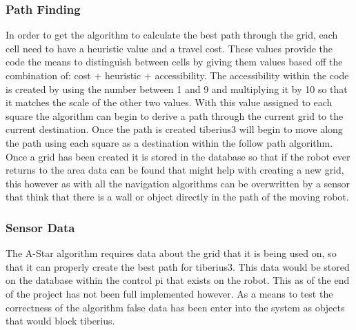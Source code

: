 \subsubsection{Path Finding}
In order to get the algorithm to calculate the best path through the grid, each cell need to have a heuristic value and a travel cost. These values provide the code the means to distinguish between cells by giving them values based off the combination of: cost + heuristic + accessibility. The accessibility within the code is created by using the number between 1 and 9 and multiplying it by 10 so that it matches the scale of the other two values. With this value assigned to each square the algorithm can begin to derive a path through the current grid to the current destination. Once the path is created \gls{tiberius3} will begin to move along the path using each square as a destination within the follow path algorithm. Once a grid has been created it is stored in the database so that if the robot ever returns to the area data can be found that might help with creating a new grid, this however as with all the navigation algorithms can be overwritten by a sensor that think that there is a wall or object directly in the path of the moving robot.
\subsubsection{Sensor Data}
The A-Star algorithm requires data about the grid that it is being used on, so that it can properly create the best path for \gls{tiberius3}. This data would be stored on the database within the control pi that exists on the robot. This as of the end of the project has not been full implemented however. As a means to test the correctness of the algorithm false data has been enter into the system as objects that would block tiberius.























